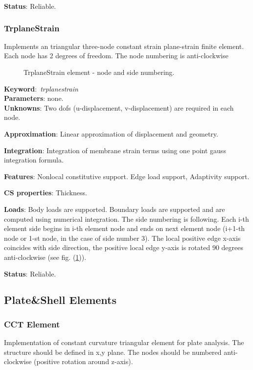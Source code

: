 \documentclass[12pt,dvips]{article}
\newcommand{\descitem}[1]{{\noindent \bf #1}:}
\newcommand{\elemkeyword}[1]{\descitem{Keyword}~{\em #1}}
\begin{document}
\descitem{Status} Reliable.


\subsubsection{TrplaneStrain}
Implements an triangular three-node  constant strain plane-strain  
finite element. Each node has 2 degrees of freedom.
The node numbering is anti-clockwise

\begin{figure}[htb]
\begin{center}\end{center}
\caption{TrplaneStrain element - node and side numbering.}
\label{TrplaneStrain}
\end{figure}

\elemkeyword{trplanestrain}\\
\descitem{Parameters} none.\\
\descitem{Unknowns}
Two dofs (u-displacement, v-displacement) are required in each node.

\descitem{Approximation} Linear approximation of displacement and
geometry.

\descitem{Integration}
Integration of membrane strain terms using one point gauss integration formula.

\descitem{Features} Nonlocal constitutive support. Edge load
support, Adaptivity support.

\descitem{CS properties} Thickness. 

\descitem{Loads} Body loads are supported. Boundary loads are
supported and are computed  using numerical integration. The side numbering is
following. Each i-th element side begins in i-th element node and
ends on next element node (i+1-th node or 1-st node, in the case of 
side number 3). The local positive edge x-axis coincides with side
direction, the positive local edge y-axis is rotated 90 degrees
anti-clockwise (see fig. (\ref{TrplaneStrain})).

\descitem{Status} Reliable.



\subsection{Plate\&Shell Elements}
\subsubsection {CCT Element}
Implementation of constant curvature triangular element for plate
analysis. The structure should be defined in x,y plane. 
The nodes should be numbered anti-clockwise (positive rotation around
z-axis). 
\end{document}
